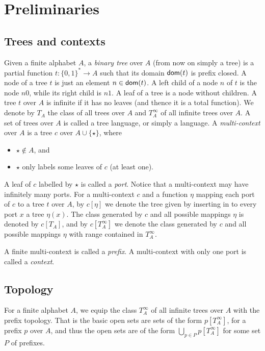 \section{Preliminaries}
\subsection{Trees and contexts}
Given a finite alphabet $A$, a \emph{binary tree} over $A$ (from now on simply a tree) is a partial function $t: \{0,1\}^* \to A$ such that its domain $\mathsf{dom}(t)$ is prefix closed. A node of a tree $t$ is just an element $n \in \mathsf{dom}(t)$. A left child of a node $n$ of $t$ is the node $n0$, while its right child is $n1$. A leaf of a tree is a node without children. A tree $t$ over $A$ is infinite if it has no leaves (and thence it is a total function). We denote by $T_A$ the class of all  trees over $A$ and $T^\infty_A$ of all infinite trees over $A$. A set of trees over $A$ is called a tree language, or simply a language.
A \emph{multi-context} over $A$ is a tree $c$ over $A \cup \{\star\}$, where 
\begin{itemize} 
\item $\star \notin A$, and 
\item $\star$ only labels some leaves of $c$ (at least one). 
\end{itemize}
A leaf of $c$ labelled by $\star$ is called a \emph{port}. Notice that a multi-context may have infinitely many ports. For a multi-context $c$ and a function $\eta$ mapping each port of $c$ to a tree $t$ over $A$, by $c[\eta]$ we denote the tree given by inserting in to every port $x$ a tree $\eta(x)$. The class generated by $c$ and all possible mappings $\eta$ is denoted by $c[T_A]$, and by $c[T^\infty_A]$ we denote the class generated by $c$ and all possible mappings $\eta$ with range contained in $T_A^\infty$. 

A finite multi-context is called a \emph{prefix}.
A multi-context with only one port is called a \emph{context}. %

\subsection{Topology}
For a finite alphabet $A$, we equip the class $T^\infty_A$ of all infinite trees over $A$ with the prefix topology. That is the basic open sets are sets of the form $p[T^\infty_A]$, for a prefix $p$ over $A$, and thus the open sets are of the form $\bigcup_{p \in P}p[T^\infty_A]$ for some set $P$ of prefixes. 

